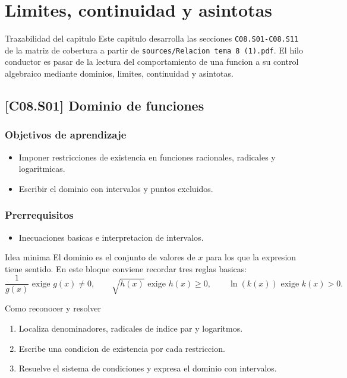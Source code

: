 \chapter{Limites, continuidad y asintotas}

\begin{theorybox}{Trazabilidad del capitulo}
Este capitulo desarrolla las secciones \texttt{C08.S01-C08.S11} de la matriz de cobertura a
partir de \texttt{sources/Relacion tema 8 (1).pdf}. El hilo conductor es pasar de la lectura
del comportamiento de una funcion a su control algebraico mediante dominios, limites,
continuidad y asintotas.
\end{theorybox}

\section{[C08.S01] Dominio de funciones}

\subsection*{Objetivos de aprendizaje}
\begin{itemize}
  \item Imponer restricciones de existencia en funciones racionales, radicales y logaritmicas.
  \item Escribir el dominio con intervalos y puntos excluidos.
\end{itemize}

\subsection*{Prerrequisitos}
\begin{itemize}
  \item Inecuaciones basicas e interpretacion de intervalos.
\end{itemize}

\begin{theorybox}{Idea minima}
El dominio es el conjunto de valores de \(x\) para los que la expresion tiene sentido. En este
bloque conviene recordar tres reglas basicas:
\[
\frac{1}{g(x)} \text{ exige } g(x)\neq 0,
\qquad
\sqrt{h(x)} \text{ exige } h(x)\geq 0,
\qquad
\ln(k(x)) \text{ exige } k(x)>0.
\]
\end{theorybox}

\begin{methodbox}{Como reconocer y resolver}
\begin{enumerate}
  \item Localiza denominadores, radicales de indice par y logaritmos.
  \item Escribe una condicion de existencia por cada restriccion.
  \item Resuelve el sistema de condiciones y expresa el dominio con intervalos.
\end{enumerate}
\end{methodbox}

